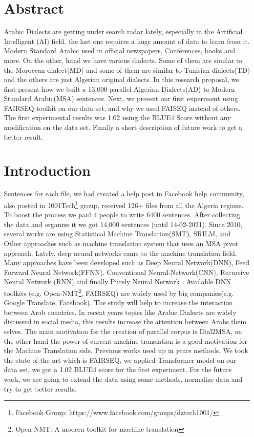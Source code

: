 \documentclass[paper=a4, fontsize=11pt]{scrartcl}
\numberwithin{equation}{section}		%
\numberwithin{figure}{section}			%
\numberwithin{table}{section}				%
\begin{document}
\section{Abstract}
Arabic Dialects are getting under search radar lately, especially in the Artificial Intelligent (AI) field, the last one requires a huge amount of data to learn from it. Modern Standard Arabic used in official newspapers, Conferences,  books and more. On the other, hand we have various dialects. Some of them are similar to the Moroccan dialect(MD) and some of them are similar to Tunisian dialects(TD) and the others are just Algerian original dialects. In this research proposal, we first present how we built a 13,000 parallel  Algerian Dialects(AD) to Modern Standard Arabic(MSA) sentences. Next, we present our first experiment using FAIRSEQ\cite{ott2019fairseq} toolkit on our data set, and why we used FAISEQ\cite{ott2019fairseq} instead of others\cite{zhang2015deep}. The first experimental results was 1.02 using the BLUE4 Score without any modification on the data set. Finally a short description of future work to get a better result.

\section{Introduction}
Sentences for each file, we had created a help post in Facebook help community, also posted in 1001Tech\footnote{Facebook Group: https://www.facebook.com/groups/dztech1001/} group, received 126+ files from all the Algeria regions. To boost the process we paid 4 people to write 6400 sentences. After collecting the data and organize it we got 14,000 sentences (until 14-02-2021). Since 2010, several works are using Statistical Machine Translation(SMT), SRILM, and Other approaches such as machine translation system that uses an MSA pivot approach\cite{meftouh2015machine}. Lately, deep neural networks came to the machine translation field. Many approaches have been developed such as Deep Neural Network(DNN), Feed Forward Neural Network(FFNN), Conventional Neural-Network(CNN), Recursive Neural Network (RNN) and finally Purely Neural Network \cite{zhang2015deep}.  Available DNN toolkits (e.g. Open-NMT\footnote{Open-NMT: A modern toolkit for machine translation}, FAIRSEQ\cite{ott2019fairseq}) are widely used by big companies(e.g. Google Translate, Facebook). The study will help to increase the interaction between Arab countries. In recent years topics like Arabic Dialects are widely discussed in social media, this results increase the attention between Arabs them selves. The main motivation for the creation of parallel corpus is Dial2MSA\cite{mubarak2018dial2msa}, on the other hand the power of current machine translation is a good motivation for the Machine Translation side. Previous works  \cite{meftouh2015machine}  \cite{tachicart2014hybrid}  \cite{mahgouba2015translator} used up in years methods. We took the state of the art which is FAIRSEQ\cite{ott2019fairseq}, we applied Transformer model on our data set, we got a 1.02 BLUE4 score for the first experiment. For the future work, we are going to extend the data using some methods, normalize data and try to get better results.
\end{document}
